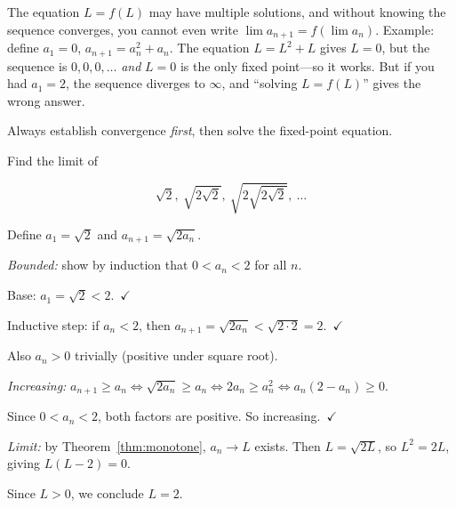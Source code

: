 \begin{examtip}[title={Exam Focus: Why you \emph{must} prove convergence before solving $L=f(L)$}]

The equation $L=f(L)$ may have multiple solutions, and without knowing the sequence converges, you cannot even write $\lim a_{n+1}=f(\lim a_n)$.
Example: define $a_1=0$, $a_{n+1}=a_n^2+a_n$. The equation $L=L^2+L$ gives $L=0$, but the sequence is $0,0,0,\dots$ \emph{and} $L=0$ is the only fixed point---so it works. But if you had $a_1=2$, the sequence diverges to $\infty$, and ``solving $L=f(L)$'' gives the wrong answer.

Always establish convergence \emph{first}, then solve the fixed-point equation.

\end{examtip}

\begin{examplebox}[title={Worked Example (Tutorial 8, Question 1): nested radicals}]

Find the limit of

\[
\sqrt{2},\ \sqrt{2\sqrt{2}},\ \sqrt{2\sqrt{2\sqrt{2}}},\ \ldots
\]

Define $a_1=\sqrt{2}$ and $a_{n+1}=\sqrt{2a_n}$.

\emph{Bounded:} show by induction that $0<a_n<2$ for all $n$.

Base: $a_1=\sqrt{2}<2$.\ $\checkmark$

Inductive step: if $a_n<2$, then $a_{n+1}=\sqrt{2a_n}<\sqrt{2\cdot 2}=2$.\ $\checkmark$

Also $a_n>0$ trivially (positive under square root).

\emph{Increasing:} $a_{n+1}\ge a_n \iff \sqrt{2a_n}\ge a_n \iff 2a_n\ge a_n^2 \iff a_n(2-a_n)\ge 0$.

Since $0<a_n<2$, both factors are positive. So increasing.\ $\checkmark$

\emph{Limit:} by Theorem~\ref{thm:monotone}, $a_n\to L$ exists. Then $L=\sqrt{2L}$, so $L^2=2L$, giving $L(L-2)=0$.

Since $L>0$, we conclude $\boxed{L=2}$.

\end{examplebox}

